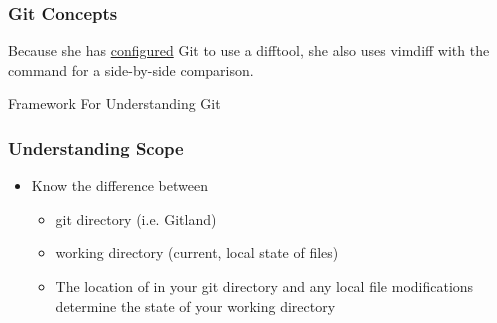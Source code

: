 \begin{frame}[fragile]\frametitle{Git Concepts}
    Because she has 
    \href{http://stackoverflow.com/questions/3713765/viewing%
    -all-git-diffs-with-vimdiff}{configured} 
    Git to use a difftool, 
    she also uses vimdiff with the command
    for a side-by-side comparison.

    \begin{center} 
        \begin{figure}[h!] \centering
        \end{figure}
    \end{center}
\end{frame}

\begin{frame}[c]
    \begin{center} \Large
        Framework For Understanding Git
    \end{center}
\end{frame}

\begin{frame}[c]\frametitle{Understanding Scope}

	\begin{itemize}
		\item Know the difference between
		\begin{itemize}
			\item git directory (i.e. Gitland)
			\item working directory (current, local state of files)
            \item
			The location of  in your git directory
			and any local file modifications determine the state
			of your working directory
		\end{itemize}
	\end{itemize}
\end{frame}

